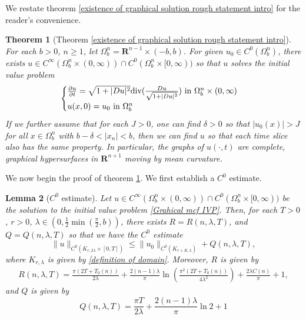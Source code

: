 \documentclass[pdflatex,sn-mathphys-num]{sn-jnl}%
\newtheorem{theorem}{Theorem}[section]
\newtheorem{lemma}[theorem]{Lemma}
\begin{document}
We restate theorem \ref{existence of graphical solution rough statement intro} for the reader's convenience. 
\begin{theorem}[Theorem \ref{existence of graphical solution rough statement intro}]\label{Graphical solution existence}
    For each $b > 0$, $n \geq 1$, let $\Omega^n_b = \mathbf{R}^{n-1} \times (-b,b)$. For given $u_0 \in C^0(\Omega^n_b)$, there exists $u \in C^{\infty}(\Omega^n_b \times (0, \infty)) \cap C^0(\Omega^n_b \times [0, \infty))$ so that $u$ solves the initial value problem
    \begin{equation}\label{Grahical mcf IVP}
        \begin{cases}
         \frac{\partial u}{\partial t} = \sqrt{1 + |Du|^2}\textit{\emph{div}}(\frac{Du}{\sqrt{1 + |Du|^2}}) \text{ in }\Omega^n_b \times (0,\infty) \\
         u(x, 0) = u_0 \text{ in }\Omega^n_b
        \end{cases}
    \end{equation}
    If we further assume that for each $J > 0$, one can find $\delta > 0$ so that $|u_0(x)| > J$ for all $x \in \Omega^n_b$ with $b - \delta < |x_n| < b$, then we can find $u$ so that each time slice also has the same property. In particular, the graphs of $u(\cdot, t)$ are complete, graphical hypersurfaces in $\mathbf{R}^{n+1}$ moving by mean curvature.
\end{theorem}
We now begin the proof of theorem \ref{Graphical solution existence}. We first establish a $C^0$ estimate. 
\begin{lemma}[$C^0$ estimate]\label{C^0 estimate}
    Let $u \in C^{\infty}(\Omega^n_b \times (0, \infty)) \cap C^0(\Omega^n_b \times [0, \infty))$ be the solution to the initial value problem \eqref{Grahical mcf IVP}. Then, for each $T > 0$, $r > 0$, $\lambda \in (0,\frac{1}{2}\min(\frac{\pi}{2},b))$, there exists $R = R(n, \lambda, T)$, and $Q = Q(n,\lambda, T)$ so that we have the $C^0$ estimate
 \begin{equation}\label{C0 estimate equation}
     \|u\|_{C^0(K_{r, 2\lambda}\times [0, T])} \leq \|u_0\|_{C^0(K_{ r + R, \lambda})} + Q(n, \lambda, T),
 \end{equation}
 where $K_{ r, \lambda}$ is given by \eqref{definition of domain}.  Moreover, $R$ is given by
\begin{align}\label{radius equation}
    R(n, \lambda,  T) = \frac{\pi (2T + T_0(n))}{2\lambda} + \frac{2(n-1)\lambda}{\pi}\ln (\frac{\pi^2(2T + T_0(n))}{4\lambda^2})+ \frac{2\lambda C(n)}{\pi} + 1,
\end{align}
and $Q$ is given by
\begin{equation}\label{extra c0 quantity estimate}
    Q(n, \lambda, T) = \frac{\pi T}{2\lambda} + \frac{2(n-1)\lambda}{\pi}\ln 2 + 1
\end{equation}
\end{lemma}
\end{document}

